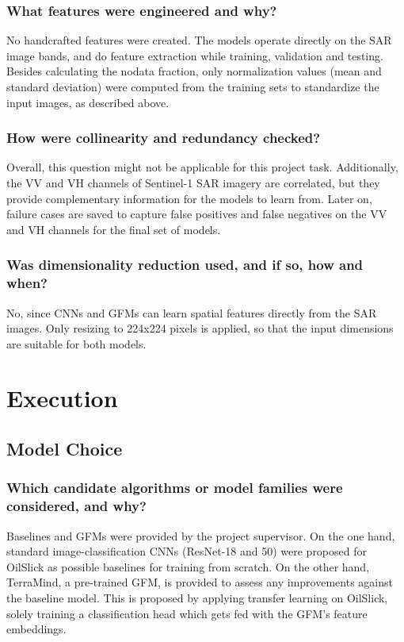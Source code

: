 \documentclass[sigconf]{acmart}
\begin{document}
\subsubsection{What features were engineered and why?} No handcrafted features were created. The models operate directly on the SAR image bands, and do feature extraction while training, validation and testing. Besides calculating the nodata fraction, only normalization values (mean and standard deviation) were computed from the training sets to standardize the input images, as described above.
\subsubsection{How were collinearity and redundancy checked?} Overall, this question might not be applicable for this project task. Additionally, the VV and VH channels of Sentinel-1 SAR imagery are correlated, but they provide complementary information for the models to learn from. Later on, failure cases are saved to capture false positives and false negatives on the VV and VH channels for the final set of models.
\subsubsection{Was dimensionality reduction used, and if so, how and when?} No, since CNNs and GFMs can learn spatial features directly from the SAR images. Only resizing to 224x224 pixels is applied, so that the input dimensions are suitable for both models.

\section{Execution}

\subsection{Model Choice}
\subsubsection{Which candidate algorithms or model families were considered, and why?} Baselines and GFMs were provided by the project supervisor. On the one hand, standard image-classification CNNs (ResNet-18 and 50) were proposed for OilSlick as possible baselines for training from scratch. On the other hand, TerraMind, a pre-trained GFM, is provided to assess any improvements against the baseline model. This is proposed by applying transfer learning on OilSlick, solely training a classification head which gets fed with the GFM's feature embeddings.
\end{document}
